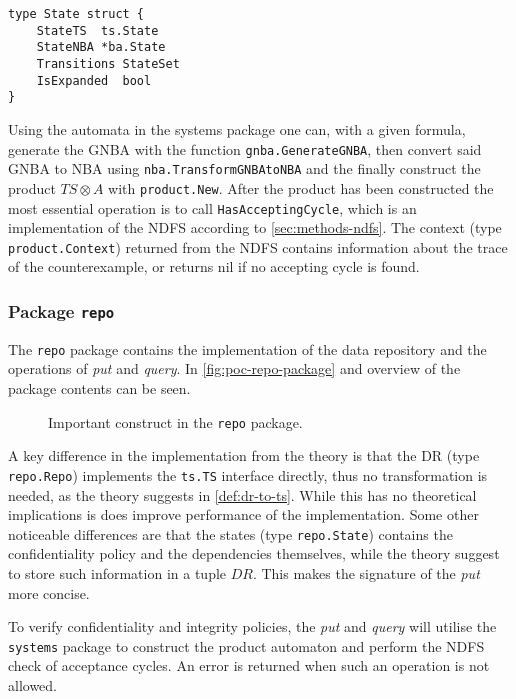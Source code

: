 \begin{lstlisting}[language=Golang, caption={Definition of \texttt{product.State}.}, label={lst:product-state}, floatplacement=H]
type State struct {
    StateTS  ts.State
    StateNBA *ba.State
    Transitions StateSet
    IsExpanded  bool
}
\end{lstlisting}

Using the automata in the systems package one can, with a given formula, generate the GNBA with the function \verb=gnba.GenerateGNBA=, then convert said GNBA to NBA using \verb=nba.TransformGNBAtoNBA= and the finally construct the product $TS\otimes A$ with \verb=product.New=. After the product has been constructed the most essential operation is to call \verb=HasAcceptingCycle=, which is an implementation of the NDFS according to \autoref{sec:methods-ndfs}. The context (type \verb=product.Context=) returned from the NDFS contains information about the trace of the counterexample, or returns nil if no accepting cycle is found.

\subsubsection{Package \texttt{repo}}
The \verb=repo= package contains the implementation of the data repository and the operations of \emph{put} and \emph{query}. In \autoref{fig:poc-repo-package} and overview of the package contents can be seen.
\begin{figure}
    \caption{Important construct in the \texttt{repo} package.}
    \label{fig:poc-repo-package}
\end{figure}
A key difference in the implementation from the theory is that the DR (type \verb=repo.Repo=) implements the \verb=ts.TS= interface directly, thus no transformation is needed, as the theory suggests in \autoref{def:dr-to-ts}. While this has no theoretical implications is does improve performance of the implementation. Some other noticeable differences are that the states (type \verb=repo.State=) contains the confidentiality policy and the dependencies themselves, while the theory suggest to store such information in a tuple $DR$. This makes the signature of the \emph{put} more concise.

To verify confidentiality and integrity policies, the \emph{put} and \emph{query} will utilise the \verb=systems= package to construct the product automaton and perform the NDFS check of acceptance cycles. An error is returned when such an operation is not allowed.
